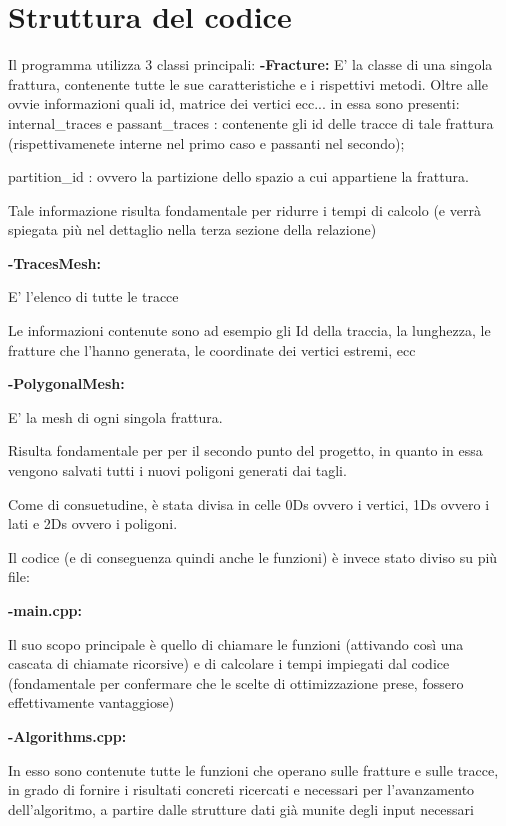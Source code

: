 \chapter{Struttura del codice}


Il programma utilizza 3 classi principali: \newline \newline
\textbf{-Fracture:}
E' la classe di una singola frattura, contenente tutte le sue caratteristiche e i rispettivi metodi.
Oltre alle ovvie informazioni quali id, matrice dei vertici ecc... in essa sono presenti: \*internal\_traces e passant\_traces : contenente gli id delle tracce di tale frattura (rispettivamenete interne nel primo caso e passanti nel secondo);

partition\_id : ovvero la partizione dello spazio a cui appartiene la frattura.

Tale informazione risulta fondamentale per ridurre i tempi di calcolo (e verrà spiegata più nel dettaglio nella terza sezione della relazione)

\textbf{-TracesMesh:}

E' l'elenco di tutte le tracce

Le informazioni contenute sono ad esempio gli Id della traccia, la lunghezza, le fratture che l'hanno generata, le coordinate dei vertici estremi, ecc

\textbf{-PolygonalMesh:}

E' la mesh di ogni singola frattura.

Risulta fondamentale per per il secondo punto del progetto, in quanto in essa vengono salvati tutti i nuovi poligoni generati dai tagli.

Come di consuetudine, è stata divisa in celle 0Ds ovvero i vertici, 1Ds ovvero i lati e 2Ds ovvero i poligoni.


Il codice (e di conseguenza quindi anche le funzioni) è invece stato diviso su più file:

\textbf{-main.cpp:}

Il suo scopo principale è quello di chiamare le funzioni (attivando così una cascata di chiamate ricorsive) e di calcolare i tempi impiegati dal codice (fondamentale per confermare che le scelte di ottimizzazione prese, fossero effettivamente vantaggiose)


\textbf{-Algorithms.cpp:}

In esso sono contenute tutte le funzioni che operano sulle fratture e sulle tracce, in grado di fornire i risultati concreti ricercati e necessari per l'avanzamento dell'algoritmo, a partire dalle strutture dati già munite degli input necessari


